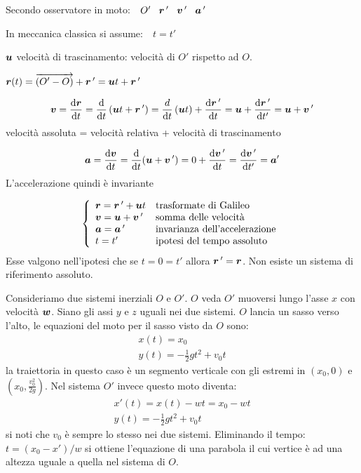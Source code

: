 Secondo osservatore in moto:$\quad O'\quad\!\boldsymbol{r}\,'\quad\!\boldsymbol{v}\,'\quad\!\boldsymbol{a}\,'$

In meccanica classica si assume:$\quad t=t'$

$\boldsymbol{u}$ velocità di trascinamento: velocità di $O'$ rispetto ad $O$.
\begin{legge}
  $\boldsymbol{r}(t)=\overrightarrow{\left(O'-O\right)}+\boldsymbol{r}\,'=\boldsymbol{u}
    t+\boldsymbol{r}\,'$
\end{legge}
\begin{legge}
  \[\boldsymbol{v}=\frac{\mathrm{d}\boldsymbol{r}}{\mathrm{d} t}=\frac{\mathrm{d}}{\mathrm{d} t}\left(\boldsymbol{u}
    t+\boldsymbol{r}\,'\right)=\frac{d}{\mathrm{d} t}\left(\boldsymbol{u}
    t\right)+\frac{\mathrm{d}\boldsymbol{r}\,'}{\mathrm{d} t}=\boldsymbol{u}+\frac{\mathrm{d}\boldsymbol{r}\,'}{\mathrm{d}
      t'}=\boldsymbol{u}+\boldsymbol{v}\,'\]
  velocità assoluta = velocità relativa + velocità di trascinamento
\end{legge}
\begin{legge}
  \[\boldsymbol{a}=\frac{\mathrm{d} \boldsymbol{v}}{\mathrm{d} t}=\frac{\mathrm{d}}{\mathrm{d} t}(\boldsymbol{u}+\boldsymbol{v}\,')=0+\frac{\mathrm{d} \boldsymbol{v}\,'}{\mathrm{d} t}=\frac{\mathrm{d} \boldsymbol{v}\,'}{\mathrm{d}
      t'}=\boldsymbol{a}'\]
  L'accelerazione quindi è invariante
\end{legge}
\[\left\{\begin{array}{ll}
    \boldsymbol{r}=\boldsymbol{r}\,'+\boldsymbol{u} t & \text{trasformate di Galileo}        \\
    \boldsymbol{v}=\boldsymbol{u}+\boldsymbol{v}\,'   & \text{somma delle velocità}          \\
    \boldsymbol{a}=\boldsymbol{a}\,'         & \text{invarianza dell'accelerazione} \\
    t=t'                   & \text{ipotesi del tempo assoluto}    \\
  \end{array}\right.\]
Esse valgono nell'ipotesi che se $t=0=t'$ allora $\boldsymbol{r}\,'=\boldsymbol{r}$.
Non esiste un sistema di riferimento assoluto.
\begin{Es}
  Consideriamo due sistemi inerziali $O$ e $O'$. $O$ veda $O'$ muoversi lungo l'asse $x$ con velocità $\boldsymbol{w}$. Siano gli assi $y$ e $z$ uguali nei due sistemi. $O$ lancia un sasso verso l'alto, le equazioni del moto per il sasso visto da $O$ sono:
  \begin{gather*}
    x(t) = x_0\\
    y(t) = -\frac{1}{2}gt^2 + v_0 t
  \end{gather*}
  la traiettoria in questo caso è un segmento verticale con gli estremi in $(x_0,0)$ e $(x_0,\frac{v_0^2}{2g})$. Nel sistema $O'$ invece questo moto diventa:
  \begin{gather*}
    x'(t) = x(t) - w t = x_0 - wt\\
    y(t) = -\frac{1}{2}gt^2 + v_0 t
  \end{gather*}
  si noti che $v_0$ è sempre lo stesso nei due sistemi. Eliminando il tempo: $t = (x_0-x') /w$ si ottiene l'equazione di una parabola il cui vertice è ad una altezza uguale a quella nel sistema di $O$.
\end{Es}


